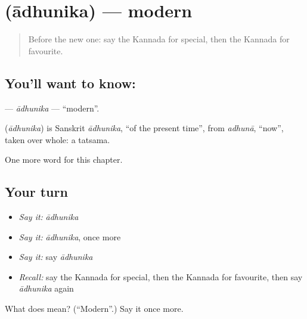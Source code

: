 \section[\texorpdfstring{\kn{ಆಧುನಿಕ} (ādhunika)}{ಆಧುನಿಕ (ādhunika)}]{ (ādhunika) — modern}

\label{lesson:KA-C181-adhunika}



\begin{quote}
Before the new one: say the Kannada for special, then the Kannada for favourite.
\end{quote}

\subsection*{You'll want to know: }
\textbf{} — \emph{ādhunika} — \textquotedblleft{}modern\textquotedblright{}.

\begin{cousinweb}
\textbf{} (\emph{ādhunika}) is Sanskrit \emph{ādhunika}, \textquotedblleft{}of the present time\textquotedblright{}, from \emph{adhunā}, \textquotedblleft{}now\textquotedblright{}, taken over whole: a tatsama.
\end{cousinweb}

\begin{grammarlens}[title={What you've built}]
One more word for this chapter.
\end{grammarlens}

\subsection*{Your turn}
\begin{itemize}
\raggedright
  \item \emph{Say it:} \emph{ādhunika}
  \item \emph{Say it:} \emph{ādhunika}, once more
  \item \emph{Say it:} say \emph{ādhunika}
  \item \emph{Recall:} say the Kannada for special, then the Kannada for favourite, then say \emph{ādhunika} again
\end{itemize}

\begin{tcolorbox}[breakable,colback=teal!4,colframe=teal!35!black,title={Before you move on}]
What does  mean? (\textquotedblleft{}Modern\textquotedblright{}.) Say it once more.
\end{tcolorbox}
